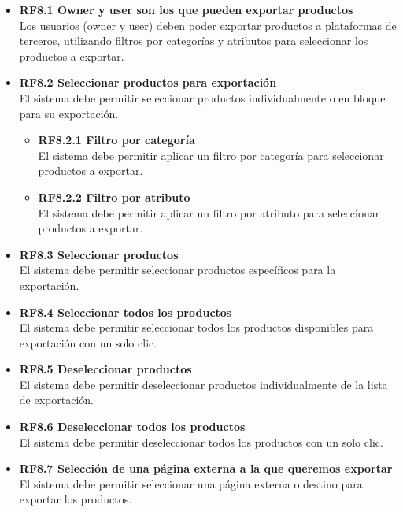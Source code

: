\documentclass{article}
\begin{document}
\begin{itemize}
    \item \textbf{RF8.1 Owner y user son los que pueden exportar productos} \\
    Los usuarios (owner y user) deben poder exportar productos a plataformas de terceros, utilizando filtros por categorías y atributos para seleccionar los productos a exportar.

    \item \textbf{RF8.2 Seleccionar productos para exportación} \\
    El sistema debe permitir seleccionar productos individualmente o en bloque para su exportación.
    \begin{itemize}
        \item \textbf{RF8.2.1 Filtro por categoría} \\
        El sistema debe permitir aplicar un filtro por categoría para seleccionar productos a exportar.

        \item \textbf{RF8.2.2 Filtro por atributo} \\
        El sistema debe permitir aplicar un filtro por atributo para seleccionar productos a exportar.
    \end{itemize}

    \item \textbf{RF8.3 Seleccionar productos} \\
    El sistema debe permitir seleccionar productos específicos para la exportación.

    \item \textbf{RF8.4 Seleccionar todos los productos} \\
    El sistema debe permitir seleccionar todos los productos disponibles para exportación con un solo clic.

    \item \textbf{RF8.5 Deseleccionar productos} \\
    El sistema debe permitir deseleccionar productos individualmente de la lista de exportación.

    \item \textbf{RF8.6 Deseleccionar todos los productos} \\
    El sistema debe permitir deseleccionar todos los productos con un solo clic.

    \item \textbf{RF8.7 Selección de una página externa a la que queremos exportar} \\
    El sistema debe permitir seleccionar una página externa o destino para exportar los productos.


\end{itemize}
\end{document}
